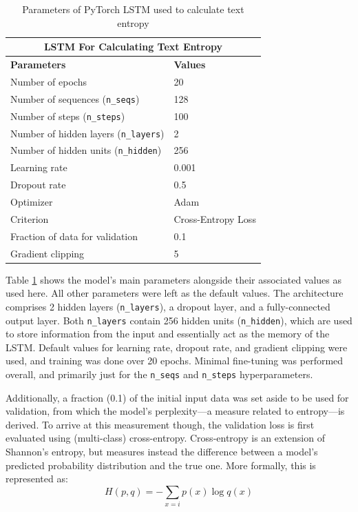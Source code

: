 \documentclass[12pt,a4paper]{article}
\numberwithin{figure}{section}
\numberwithin{table}{section}
\numberwithin{definition}{section}
\begin{document}
\begin{table}[!h] 
  \centering\small
  \renewcommand{\arraystretch}{1.5} 
  \begin{tabular}{@{}ll@{}}
  \hline
  \multicolumn{2}{|c|}{\textbf{LSTM For Calculating Text Entropy}} \\
  \hline
  \textbf{Parameters} & \textbf{Values} \\
  \hline
  Number of epochs & 20 \\
  Number of sequences (\texttt{n\_seqs}) & 128 \\
  Number of steps (\texttt{n\_steps}) & 100 \\
  Number of hidden layers (\texttt{n\_layers}) & 2 \\
  Number of hidden units (\texttt{n\_hidden}) & 256 \\
  Learning rate & 0.001 \\
  Dropout rate & 0.5 \\
  Optimizer & Adam \\
  Criterion & Cross-Entropy Loss \\
  Fraction of data for validation & 0.1 \\
  Gradient clipping & 5 \\
  \hline
  \end{tabular}
  \caption{Parameters of PyTorch LSTM used to calculate text entropy}
  \label{tbl:pytorchlstmparams}
\end{table}

Table \ref{tbl:pytorchlstmparams} shows the model's main parameters alongside their associated values as used here. All other parameters were left as the default values. The architecture comprises 2 hidden layers (\texttt{n\_layers}), a dropout layer, and a fully-connected output layer. Both \texttt{n\_layers} contain 256 hidden units (\texttt{n\_hidden}), which are used to store information from the input and essentially act as the memory of the LSTM. Default values for learning rate, dropout rate, and gradient clipping were used, and training was done over 20 epochs. Minimal fine-tuning was performed overall, and primarily just for the \texttt{n\_seqs} and \texttt{n\_steps} hyperparameters. 

Additionally, a fraction (0.1) of the initial input data was set aside to be used for validation, from which the model's perplexity---a measure related to entropy---is derived. To arrive at this measurement though, the validation loss is first evaluated using (multi-class) cross-entropy. Cross-entropy is an extension of Shannon's entropy, but measures instead the difference between a model's predicted probability distribution and the true one. More formally, this is represented as: \[H(p,q) = -\sum_{x=i}p(x)\log q(x)\]
\end{document}
